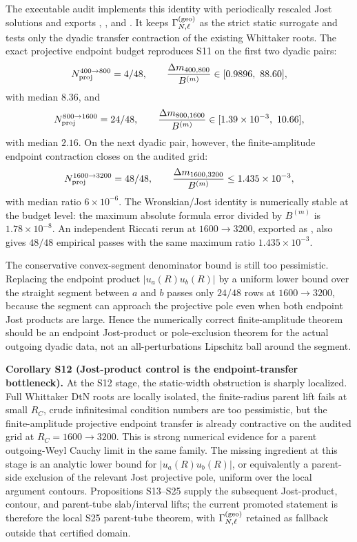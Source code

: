 \documentclass[aps,prd,onecolumn,notitlepage,nofootinbib,superscriptaddress,11pt,floatfix]{revtex4-2}
\begin{document}
The executable audit  implements this identity with periodically rescaled Jost solutions and exports , , and .  It keeps \(\Gamma_{N,\ell}^{\rm(geo)}\) as the strict static surrogate and tests only the dyadic transfer contraction of the existing Whittaker roots.  The exact projective endpoint budget reproduces S11 on the first two dyadic pairs:
\[
N_{\rm proj}^{400\to800}=4/48,\qquad
\frac{\Delta m_{400,800}}{B^{(m)}}\in[0.9896,\ 88.60],
\]
with median \(8.36\), and
\[
N_{\rm proj}^{800\to1600}=24/48,\qquad
\frac{\Delta m_{800,1600}}{B^{(m)}}\in[1.39\times10^{-3},\ 10.66],
\]
with median \(2.16\).  On the next dyadic pair, however, the finite-amplitude endpoint contraction closes on the audited grid:
\[
N_{\rm proj}^{1600\to3200}=48/48,\qquad
\frac{\Delta m_{1600,3200}}{B^{(m)}}\le 1.435\times10^{-3},
\]
with median ratio \(6\times10^{-6}\).  The Wronskian/Jost identity is numerically stable at the budget level: the maximum absolute formula error divided by \(B^{(m)}\) is \(1.78\times10^{-8}\).  An independent Riccati rerun at \(1600\to3200\), exported as , also gives \(48/48\) empirical passes with the same maximum ratio \(1.435\times10^{-3}\).

The conservative convex-segment denominator bound is still too pessimistic.  Replacing the endpoint product \(|u_a(R)u_b(R)|\) by a uniform lower bound over the straight segment between \(a\) and \(b\) passes only \(24/48\) rows at \(1600\to3200\), because the segment can approach the projective pole even when both endpoint Jost products are large.  Hence the numerically correct finite-amplitude theorem should be an endpoint Jost-product or pole-exclusion theorem for the actual outgoing dyadic data, not an all-perturbations Lipschitz ball around the segment.

\medskip\noindent\textbf{Corollary S12 (Jost-product control is the endpoint-transfer bottleneck).}
At the S12 stage, the static-width obstruction is sharply localized.  Full Whittaker DtN roots are locally isolated, the finite-radius parent lift fails at small \(R_C\), crude infinitesimal condition numbers are too pessimistic, but the finite-amplitude projective endpoint transfer is already contractive on the audited grid at \(R_C=1600\to3200\).  This is strong numerical evidence for a parent outgoing-Weyl Cauchy limit in the same family.  The missing ingredient at this stage is an analytic lower bound for \(|u_a(R)u_b(R)|\), or equivalently a parent-side exclusion of the relevant Jost projective pole, uniform over the local argument contours.  Propositions S13--S25 supply the subsequent Jost-product, contour, and parent-tube slab/interval lifts; the current promoted statement is therefore the local S25 parent-tube theorem, with \(\Gamma_{N,\ell}^{\rm(geo)}\) retained as fallback outside that certified domain.
\end{document}
